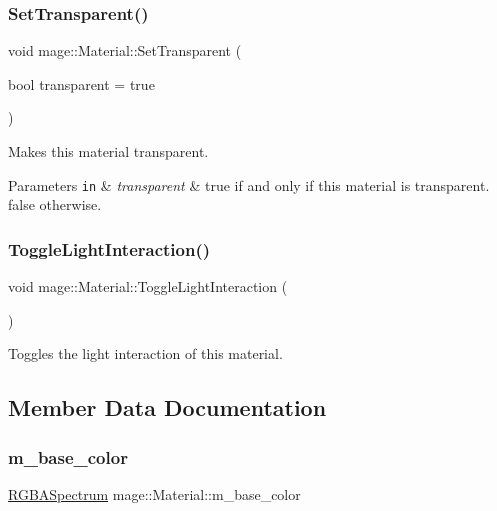 \subsubsection{\texorpdfstring{Set\+Transparent()}{SetTransparent()}}
{\footnotesize\ttfamily void mage\+::\+Material\+::\+Set\+Transparent (\begin{DoxyParamCaption}\item[{bool}]{transparent = {\ttfamily true} }\end{DoxyParamCaption})\hspace{0.3cm}{\ttfamily [noexcept]}}

Makes this material transparent.


\begin{DoxyParams}[1]{Parameters}
\mbox{\tt in}  & {\em transparent} & {\ttfamily true} if and only if this material is transparent. {\ttfamily false} otherwise. \\
\hline
\end{DoxyParams}
\hypertarget{structmage_1_1_material_a9c8c15d426461b4a597b9a9947a7bd62}{}\label{structmage_1_1_material_a9c8c15d426461b4a597b9a9947a7bd62} 
\subsubsection{\texorpdfstring{Toggle\+Light\+Interaction()}{ToggleLightInteraction()}}
{\footnotesize\ttfamily void mage\+::\+Material\+::\+Toggle\+Light\+Interaction (\begin{DoxyParamCaption}{ }\end{DoxyParamCaption})\hspace{0.3cm}{\ttfamily [noexcept]}}

Toggles the light interaction of this material. 

\subsection{Member Data Documentation}
\hypertarget{structmage_1_1_material_a3425f685923d7cf24117c93385122e4b}{}\label{structmage_1_1_material_a3425f685923d7cf24117c93385122e4b} 
\subsubsection{\texorpdfstring{m\+\_\+base\+\_\+color}{m\_base\_color}}
{\footnotesize\ttfamily \hyperlink{structmage_1_1_r_g_b_a_spectrum}{R\+G\+B\+A\+Spectrum} mage\+::\+Material\+::m\+\_\+base\+\_\+color\hspace{0.3cm}{\ttfamily [private]}}


